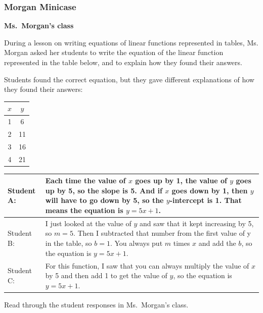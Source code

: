 \documentclass[11pt]{article}
\newcommand{\handout}{\subsubsection}
\theoremstyle{definition}
\begin{document}
\handout{Morgan Minicase}

\begin{mdframed}
\begin{center} {\bf Ms.~Morgan's class} \end{center}
\begin{minipage}{5in}\raggedright \parskip4pt
During a lesson on writing equations of linear functions represented in tables, Ms. Morgan
asked her students to write the equation of the linear function represented in the table below,
and to explain how they found their answers.

Students found the correct equation, but they gave different explanations of how they found
their answers:
\end{minipage}
\begin{minipage}{1in}
\vspace*{-20pt}
\begin{center}\begin{tabular}{c|c}
$x$ & $y$ \\ \hline
1 & 6  \\ 
2 & 11 \\ 
3 & 16 \\
4 & 21 
\end{tabular}
\end{center}
\end{minipage}

\begin{tabular}{L{0.75in}L{5in}}
\hline
Student A: & Each time the value of $x$ goes up by 1, the value of $y$ goes up by 5, so the
slope is 5. And if $x$ goes down by 1, then $y$ will have to go down by 5, so
the $y$-intercept is 1. That means the equation is $y = 5x + 1$.
\\ \hline
Student B: &  I just looked at the value of $y$ and saw that it kept increasing by 5, so $m =
5$. Then I subtracted that number from the first value
of y in the table, so $b = 1$. You always put $m$ times $x$ and add the $b$, so the
equation is $y = 5x + 1$.
\\ \hline
Student C: & For this function, I saw that you can always multiply the value of $x$ by 5
and then add 1 to get the value of $y$, so the equation is $y = 5x + 1.$
\\ \hline
\end{tabular}
\end{mdframed}

Read through the student responses in Ms.~Morgan's class.
\end{document}
